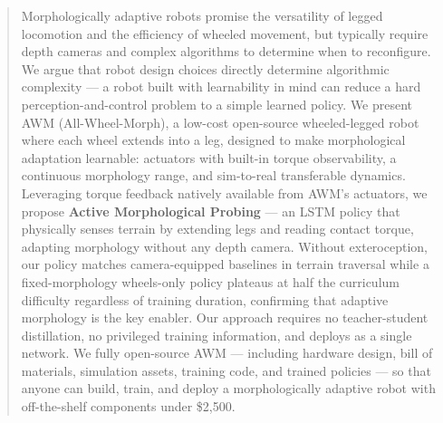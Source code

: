 
\begin{abstract}
Morphologically adaptive robots promise the versatility of legged locomotion and the
efficiency of wheeled movement, but typically require depth cameras and complex algorithms
to determine when to reconfigure. We argue that robot design choices directly determine
algorithmic complexity — a robot built with learnability in mind can reduce a hard
perception-and-control problem to a simple learned policy. We present AWM (All-Wheel-Morph),
a low-cost open-source wheeled-legged robot where each wheel extends into a leg, designed
to make morphological adaptation learnable: actuators with built-in torque observability,
a continuous morphology range, and sim-to-real transferable dynamics. Leveraging torque
feedback natively available from AWM's actuators, we propose \textbf{Active Morphological
Probing} --- an LSTM policy that physically senses terrain by extending legs and reading
contact torque, adapting morphology without any depth camera. Without exteroception, our
policy matches camera-equipped baselines in terrain traversal while a fixed-morphology
wheels-only policy plateaus at half the curriculum difficulty regardless of training
duration, confirming that adaptive morphology is the key enabler. Our approach requires
no teacher-student distillation, no privileged training information, and deploys as a
single network. We fully open-source AWM --- including hardware design, bill of materials,
simulation assets, training code, and trained policies --- so that anyone can build, train,
and deploy a morphologically adaptive robot with off-the-shelf components under \$2,500.
\end{abstract}
